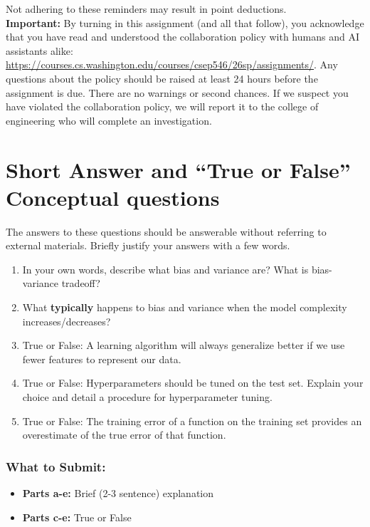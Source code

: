 \documentclass{article}
\begin{document}
Not adhering to these reminders may result in point deductions. \\

\textbf{Important:} By turning in this assignment (and all that follow), you acknowledge that you have read and understood the collaboration policy with humans and AI assistants alike: \url{https://courses.cs.washington.edu/courses/csep546/26sp/assignments/}. Any questions about the policy should be raised at least 24 hours before the assignment is due. There are no warnings or second chances. If we suspect you have violated the collaboration policy, we will report it to the college of engineering who will complete an investigation.

\newpage
\section*{Short Answer and ``True or False'' Conceptual questions}
\begin{aprob}
    The answers to these questions should be answerable without referring to external materials.  Briefly justify your answers with a few words.
    \begin{enumerate}
        \item{} In your own words, describe what bias and variance are? What is bias-variance tradeoff?
        \item {} What \textbf{typically} happens to bias and variance when the model complexity increases/decreases?
        \item {} True or False: A learning algorithm will always generalize better if we use fewer features to represent our data. 
        \item {} True or False: Hyperparameters should be tuned on the test set. Explain your choice and detail a procedure for hyperparameter tuning.
        \item {} True or False: The training error of a function on the training set provides an overestimate of the true error of that function.
    \end{enumerate}
    \subsubsection*{What to Submit:}
    \begin{itemize}
        \item \textbf{Parts a-e:} Brief (2-3 sentence) explanation
        \item \textbf{Parts c-e:} True or False
    \end{itemize}
\end{aprob}
\end{document}
